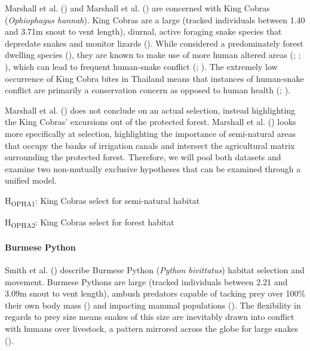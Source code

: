 \documentclass[10pt,a4paper]{article}
\begin{document}
Marshall et al. () and Marshall et al. () are concerned with King Cobras (\emph{Ophiophagus hannah}).
King Cobras are a large (tracked individuals between 1.40 and 3.71m snout to vent length), diurnal, active foraging snake species that depredate snakes and monitor lizards ().
While considered a predominately forest dwelling species (), they are known to make use of more human altered areas (; ; ), which can lead to frequent human-snake conflict (; ).
The extremely low occurrence of King Cobra bites in Thailand means that instances of human-snake conflict are primarily a conservation concern as opposed to human health (; ).

Marshall et al. () does not conclude on an actual selection, instead highlighting the King Cobras' excursions out of the protected forest.
Marshall et al. () looks more specifically at selection, highlighting the importance of semi-natural areas that occupy the banks of irrigation canals and intersect the agricultural matrix surrounding the protected forest.
Therefore, we will pool both datasets and examine two non-mutually exclusive hypotheses that can be examined through a unified model.

H\textsubscript{OPHA1}: King Cobras select for semi-natural habitat

H\textsubscript{OPHA2}: King Cobras select for forest habitat

\paragraph{Burmese Python}\label{burmese-python}

Smith et al. () describe Burmese Python (\emph{Python bivittatus}) habitat selection and movement.
Burmese Pythons are large (tracked individuals between 2.21 and 3.09m snout to vent length), ambush predators capable of tacking prey over 100\% their own body mass () and impacting mammal populations ().
The flexibility in regards to prey size means snakes of this size are inevitably drawn into conflict with humans over livestock, a pattern mirrored across the globe for large snakes ().
\end{document}

